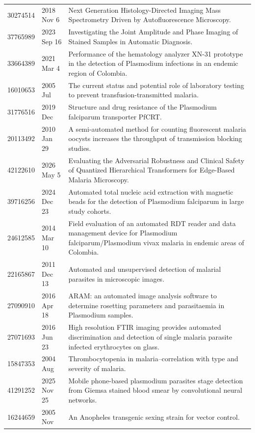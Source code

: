 \begin{longtable}{llp{9.5cm}}
30274514 & 2018 Nov 6 & Next Generation Histology-Directed Imaging Mass Spectrometry Driven by Autofluorescence Microscopy. \\
37765989 & 2023 Sep 16 & Investigating the Joint Amplitude and Phase Imaging of Stained Samples in Automatic Diagnosis. \\
33664389 & 2021 Mar 4 & Performance of the hematology analyzer XN-31 prototype in the detection of Plasmodium infections in an endemic region of Colombia. \\
16010653 & 2005 Jul & The current status and potential role of laboratory testing to prevent transfusion-transmitted malaria. \\
31776516 & 2019 Dec & Structure and drug resistance of the Plasmodium falciparum transporter PfCRT. \\
20113492 & 2010 Jan 29 & A semi-automated method for counting fluorescent malaria oocysts increases the throughput of transmission blocking studies. \\
42122610 & 2026 May 5 & Evaluating the Adversarial Robustness and Clinical Safety of Quantized Hierarchical Transformers for Edge-Based Malaria Microscopy. \\
39716256 & 2024 Dec 23 & Automated total nucleic acid extraction with magnetic beads for the detection of Plasmodium falciparum in large study cohorts. \\
24612585 & 2014 Mar 10 & Field evaluation of an automated RDT reader and data management device for Plasmodium falciparum/Plasmodium vivax malaria in endemic areas of Colombia. \\
22165867 & 2011 Dec 13 & Automated and unsupervised detection of malarial parasites in microscopic images. \\
27090910 & 2016 Apr 18 & ARAM: an automated image analysis software to determine rosetting parameters and parasitaemia in Plasmodium samples. \\
27071693 & 2016 Jun 23 & High resolution FTIR imaging provides automated discrimination and detection of single malaria parasite infected erythrocytes on glass. \\
15847353 & 2004 Aug & Thrombocytopenia in malaria--correlation with type and severity of malaria. \\
41291252 & 2025 Nov 25 & Mobile phone-based plasmodium parasites stage detection from Giemsa stained blood smear by convolutional neural networks. \\
16244659 & 2005 Nov & An Anopheles transgenic sexing strain for vector control. \\

\end{longtable}
